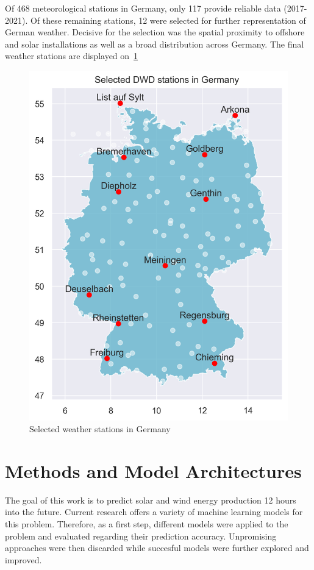 \documentclass[11pt,table]{article}
\begin{document}
Of 468 meteorological stations in Germany, only 117 provide reliable data (2017-2021). Of these remaining stations, 12 were selected for further representation of German weather. Decisive for the selection was the spatial proximity to offshore and solar installations as well as a broad distribution across Germany. The final weather stations are displayed on~\ref{fig:weatherStations}
\begin{figure}[H]
	\centering
	\includegraphics[scale=0.5]{Figures/weatherStations.png}
	\caption{Selected weather stations in Germany}
	\label{fig:weatherStations}
\end{figure}

\section{Methods and Model Architectures}

The goal of this work is to predict solar and wind energy production 12 hours into the future. Current research offers a variety of machine learning models for this problem. Therefore, as a first step, different models were applied to the problem and evaluated regarding their prediction accuracy. Unpromising approaches were then discarded while succesful models were further explored and improved.
\end{document}
